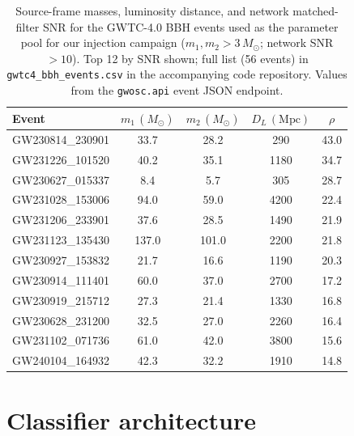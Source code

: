 \documentclass[11pt,a4paper]{article}
\newcommand{\msun}{M_{\odot}}
\newcommand{\Mpc}{\text{Mpc}}
\begin{document}
\begin{table}[h]
  \centering
  \caption{Source-frame masses, luminosity distance, and network
    matched-filter SNR for the GWTC-4.0 BBH events used as the parameter
    pool for our injection campaign ($m_{1},m_{2}>3\,\msun$;
    network SNR $>10$). Top 12 by SNR shown; full list (56 events) in
    {\tt gwtc4\_bbh\_events.csv} in the accompanying code repository. Values from the
    \texttt{gwosc.api} event JSON endpoint.}
  \label{tab:catalog}
  \begin{tabular}{lcccc}
    \hline\hline
    Event & $m_{1}\,(\msun)$ & $m_{2}\,(\msun)$ & $D_{L}\,(\Mpc)$ & $\rho$ \\
    \hline
    GW230814\_230901 & 33.7 & 28.2 & 290 & 43.0 \\
    GW231226\_101520 & 40.2 & 35.1 & 1180 & 34.7 \\
    GW230627\_015337 & 8.4  & 5.7  & 305  & 28.7 \\
    GW231028\_153006 & 94.0 & 59.0 & 4200 & 22.4 \\
    GW231206\_233901 & 37.6 & 28.5 & 1490 & 21.9 \\
    GW231123\_135430 & 137.0 & 101.0 & 2200 & 21.8 \\
    GW230927\_153832 & 21.7 & 16.6 & 1190 & 20.3 \\
    GW230914\_111401 & 60.0 & 37.0 & 2700 & 17.2 \\
    GW230919\_215712 & 27.3 & 21.4 & 1330 & 16.8 \\
    GW230628\_231200 & 32.5 & 27.0 & 2260 & 16.4 \\
    GW231102\_071736 & 61.0 & 42.0 & 3800 & 15.6 \\
    GW240104\_164932 & 42.3 & 32.2 & 1910 & 14.8 \\
    \hline\hline
  \end{tabular}
\end{table}

\section{Classifier architecture}\label{app:arch}
\end{document}
